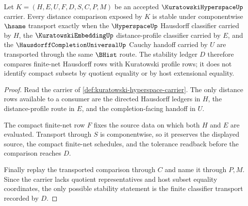 \begin{theorem}
\label{thm:kuratowski-hyperspace-distance-stability}
Let $K=(H,E,U,F,D,S,C,P,M)$ be an accepted $\KuratowskiHyperspaceUp$ carrier. Every distance comparison exposed by $K$ is stable under componentwise $\hsame$ transport exactly when the $\HyperspaceUp$ Hausdorff classifier carried by $H$, the $\KuratowskiEmbeddingUp$ distance-profile classifier carried by $E$, and the $\HausdorffCompletionUniversalUp$ Cauchy handoff carried by $U$ are transported through the same $\BHist$ route. The stability ledger $D$ therefore compares finite-net Hausdorff rows with Kuratowski profile rows; it does not identify compact subsets by quotient equality or by host extensional equality.
\end{theorem}
\begin{proof}
Read the carrier of \autoref{def:kuratowski-hyperspace-carrier}. The only distance rows available to a consumer are the directed Hausdorff ledgers in $H$, the distance-profile route in $E$, and the completion-facing handoff in $U$.

The compact finite-net row $F$ fixes the source data on which both $H$ and $E$ are evaluated. Transport through $S$ is componentwise, so it preserves the displayed source, the compact finite-net schedules, and the tolerance readback before the comparison reaches $D$.

Finally replay the transported comparison through $C$ and name it through $P,M$. Since the carrier lacks quotient representatives and host subset equality coordinates, the only possible stability statement is the finite classifier transport recorded by $D$.
\end{proof}

